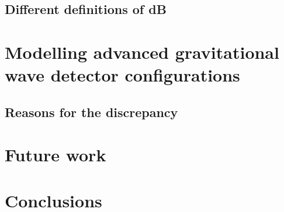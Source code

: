 \documentclass[aps,pra,superscriptaddress,reprint,nofootinbib]{revtex4-1}
\begin{document}


\subsection{Different definitions of dB}





\section{Modelling advanced gravitational wave detector configurations}
\label{sec:aLIGOcomparison}


\subsection{Reasons for the discrepancy}





\section{Future work}
\label{sec:future_work}



\section{Conclusions}
\label{sec:conclusions}


\begin{acknowledgments}



\end{acknowledgments}


\appendix
% 


\nocite{*}


\end{document}
